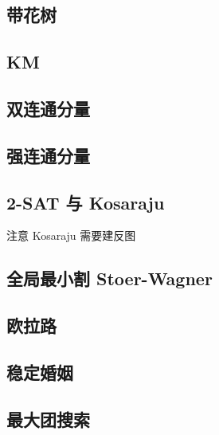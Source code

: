 \documentclass[landscape, twocolumn, 8pt, a4paper, twoside]{extarticle}
\begin{document}
\begin{spacing}{0.1}
\subsection{带花树}


\subsection{KM}


\subsection{双连通分量}


\subsection{强连通分量}


\subsection{2-SAT 与 Kosaraju}
注意 Kosaraju 需要建反图


\subsection{全局最小割 Stoer-Wagner}


%

\subsection{欧拉路}


\subsection{稳定婚姻}


\subsection{最大团搜索}



\end{spacing}
\end{document}
